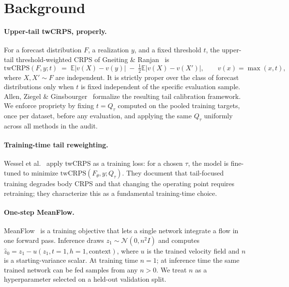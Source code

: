 \documentclass{article}
\begin{document}
\section{Background}
\label{sec:background}

\paragraph{Upper-tail twCRPS, properly.} For a forecast distribution
$F$, a realization $y$, and a fixed threshold $t$, the upper-tail
threshold-weighted CRPS of Gneiting \& Ranjan~\cite{gneiting2011weighted}
is
\[
\text{twCRPS}(F, y; t) \;=\; \mathbb{E}\lvert v(X) - v(y)\rvert \;-\;
\tfrac{1}{2}\mathbb{E}\lvert v(X) - v(X')\rvert,\qquad
v(x) = \max(x, t),
\]
where $X, X' \sim F$ are independent. It is strictly proper over
the class of forecast distributions only when $t$ is fixed
independent of the specific evaluation sample. Allen, Ziegel \&
Ginsbourger~\cite{allen2025tail} formalize the resulting tail
calibration framework. We enforce propriety by fixing $t = Q_\tau$
computed on the pooled training targets, once per dataset, before
any evaluation, and applying the same $Q_\tau$ uniformly across all
methods in the audit.

\paragraph{Training-time tail reweighting.} Wessel et
al.~\cite{wessel2025tail} apply twCRPS as a training loss: for a
chosen $\tau$, the model is fine-tuned to minimize
$\text{twCRPS}(F_\theta, y; Q_\tau)$. They document that
tail-focused training degrades body CRPS and that changing the
operating point requires retraining; they characterize this as a
fundamental training-time choice.

\paragraph{One-step MeanFlow.} MeanFlow~\cite{geng2025meanflow} is
a training objective that lets a single network integrate a flow in
one forward pass. Inference draws $z_1 \sim \mathcal{N}(0, n^2 I)$
and computes $\hat{z}_0 = z_1 - u(z_1, t{=}1, h{=}1, \text{context})$,
where $u$ is the trained velocity field and $n$ is a starting-variance
scalar. At training time $n = 1$; at inference time the same
trained network can be fed samples from any $n > 0$. We treat $n$
as a hyperparameter selected on a held-out validation split.
\end{document}
